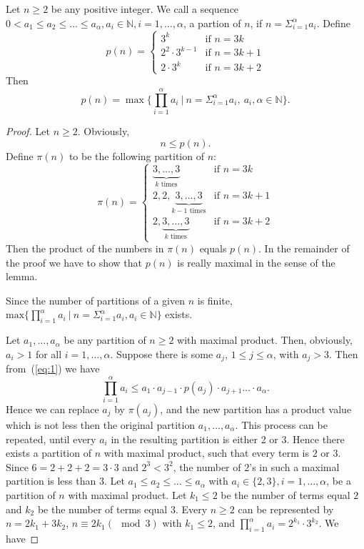 \begin{lemma}\label{lemma:minhitmax}
Let $n\ge 2$ be any positive integer.
We call a sequence $0 < a_1\le a_2\le \ldots\le  a_{\alpha}, a_i\in \mathbb{N}, i=1,\dots, \alpha$, a partion of $n$, if $n=\Sigma_{i=1}^{\alpha}a_i$.
Define
$$p(n)=\begin{cases} 3^k &\text{if}\,\, n=3k\\ 2^2\cdot 3^{k-1} &\text{if}\,\, n=3k+1\\2\cdot 3^{k} &\text{if}\,\, n=3k+2\end{cases}$$
Then  $$p(n)=\max\big\{\prod_{i=1}^{\alpha}a_i~|~n=\Sigma_{i=1}^{\alpha}a_i,\ a_i,
\alpha\in \mathbb{N}\big\}.$$
\end{lemma}
\begin{proof}
Let $n\ge 2$.
Obviously, \begin{equation}\label{eq:1} n\le p(n).\end{equation}
Define $\pi(n)$ to be the following partition  of $n$: 
$$\pi(n)=\begin{cases} \underbrace{3,\ldots,3}_{k\text{ times}}  &\text{if}\,\, n=3k\\ 2,2,\underbrace{3,\ldots,3}_{k-1\text{ times}}  &\text{if}\,\, n=3k+1\\2,\underbrace{3,\ldots,3}_{k\text{ times}}  &\text{if}\,\, n=3k+2\end{cases}$$
Then the product of the numbers in 
$\pi(n)$ equals  $p(n)$. In the remainder of the proof
we have to show that $p(n)$ is really maximal in the sense of the lemma.

  
Since the number of partitions of a given $n$ is finite, $\text{max}\{\prod_{i=1}^{\alpha}a_i~|~n=\Sigma_{i=1}^{\alpha}a_i, a_i\in \mathbb{N}\}$ exists. 


Let $a_1, \ldots , a_{\alpha}$ be any partition of $n\ge 2$ with maximal product. Then,
obviously,  $a_i>1$ for all $i=1,\dots,\alpha$.
Suppose there is some $a_j$, $1\le j\le \alpha$, with $a_j>3$. Then from~(\ref{eq:1}) we have 
$$\prod_{i=1}^{\alpha}a_i\le a_1\cdot a_{j-1}\cdot p(a_j)\cdot a_{j+1}\ldots\cdot a_{\alpha}.$$
Hence we can replace $a_j$ by $\pi(a_j)$, and the new partition has  a product value
which is not less then the original partition $a_1, \ldots , a_{\alpha}$. This process
can be repeated, until every $a_i$ in the resulting partition is either 2 or 3.
Hence there exists a partition of $n$ with maximal product, such that every term is $2$ or $3$.
Since $6=2+2+2=3\cdot 3$ and $2^3< 3^2$, the number of $2$'s in such a maximal partition is less than $3$. 
Let $a_1\le a_2\le \ldots\le  a_{\alpha}$ with $a_i\in \{2,3\}, i=1,\dots,\alpha$, be a partition of $n$ with maximal product. Let $k_1\le 2$ be the number of terms equal $2$ and $k_2$ be the number of terms equal $3$.
Every $n\ge 2$ can be represented by $n=2k_1+3k_2$, $n\equiv 2k_1 (\mod 3)$ with $k_1\le 2$, and $\prod_{i=1}^{\alpha}a_i=2^{k_1}\cdot 3^{k_2}$. We have 


\end{proof}
